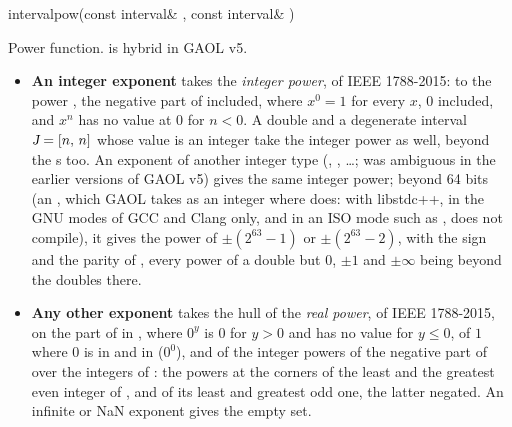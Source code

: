 \begin{deffun}{interval}{pow}{(const interval\& , const interval\& )}
  \begin{operation}
  \end{operation}
  Power function.  is hybrid in GAOL v5.\newinvfive
  \begin{itemize}
  \item[$\bullet$] \textbf{An integer exponent} takes the \emph{integer
    power},  of IEEE 1788-2015:  to the power ,
    the negative part of  included, where $x^0=1$ for every $x$, 0
    included, and $x^n$ has no value at 0 for $n<0$. A double  and a
    degenerate interval $\textsl{J}=[n,\,n]$ whose value is an integer take
    the integer power as well, beyond the s too.\newinvfive{} An
    exponent  of another integer type  (, , \dots;  was ambiguous in the earlier
    versions of GAOL v5) gives the same integer power; beyond 64 bits (an
    , which GAOL takes as an integer where
     does: with libstdc++, in the GNU modes of GCC and
    Clang only, and in an ISO mode such as ,
     does not compile), it gives the power of $\pm(2^{63}-1)$ or
    $\pm(2^{63}-2)$, with the sign and the parity of , every power of
    a double but $0$, $\pm1$ and $\pm\infty$ being beyond the doubles
    there.\newinvfive
  \item[$\bullet$] \textbf{Any other exponent} takes the hull of the
    \emph{real power},  of IEEE 1788-2015, on the part of  in
    , where $0^y$ is $0$ for $y>0$ and has no value for
    $y\leq0$, of $1$ where $0$ is in  and in  ($0^0$), and of
    the integer powers of the negative part of  over the integers of
    : the powers at the corners of the least and the greatest even
    integer of , and of its least and greatest odd one, the latter
    negated.\newinvfive{} An infinite or NaN exponent  gives the empty
    set.
  \end{itemize}
\end{deffun}


